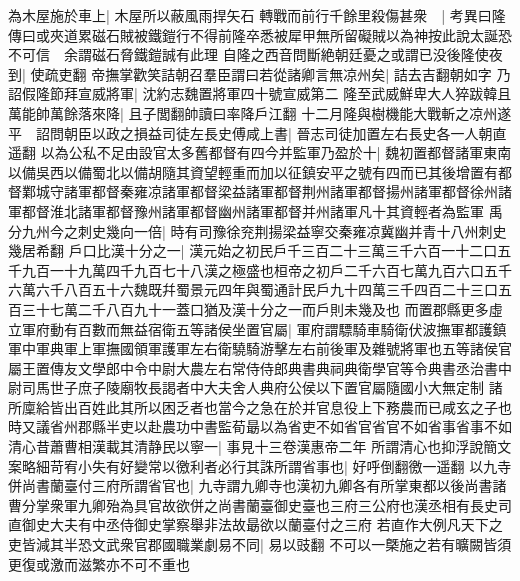 為木屋施於車上|{
	木屋所以蔽風雨捍矢石}
轉戰而前行千餘里殺傷甚衆　|{
	考異曰隆傳曰或夾道累磁石賊被鐵鎧行不得前隆卒悉被犀甲無所留礙賊以為神按此說太誕恐不可信　余謂磁石脅鐵鎧誠有此理}
自隆之西音問斷絶朝廷憂之或謂已没後隆使夜到|{
	使疏吏翻}
帝撫掌歡笑詰朝召羣臣謂曰若從諸卿言無凉州矣|{
	詰去吉翻朝如字}
乃詔假隆節拜宣威將軍|{
	沈約志魏置將軍四十號宣威第二}
隆至武威鮮卑大人猝跋韓且萬能帥萬餘落來降|{
	且子閭翻帥讀曰率降戶江翻}
十二月隆與樹機能大戰斬之凉州遂平　詔問朝臣以政之損益司徒左長史傅咸上書|{
	晉志司徒加置左右長史各一人朝直遥翻}
以為公私不足由設官太多舊都督有四今并監軍乃盈於十|{
	魏初置都督諸軍東南以備吳西以備蜀北以備胡隨其資望輕重而加以征鎮安平之號有四而已其後增置有都督鄴城守諸軍都督秦雍凉諸軍都督梁益諸軍都督荆州諸軍都督揚州諸軍都督徐州諸軍都督淮北諸軍都督豫州諸軍都督幽州諸軍都督并州諸軍凡十其資輕者為監軍}
禹分九州今之刺史幾向一倍|{
	時有司豫徐兖荆揚梁益寧交秦雍凉冀幽并青十八州刺史幾居希翻}
戶口比漢十分之一|{
	漢元始之初民戶千三百二十三萬三千六百一十二口五千九百一十九萬四千九百七十八漢之極盛也桓帝之初戶二千六百七萬九百六口五千六萬六千八百五十六魏既幷蜀景元四年與蜀通計民戶九十四萬三千四百二十三口五百三十七萬二千八百九十一蓋口猶及漢十分之一而戶則未幾及也}
而置郡縣更多虛立軍府動有百數而無益宿衛五等諸侯坐置官屬|{
	軍府謂驃騎車騎衛伏波撫軍都護鎮軍中軍典軍上軍撫國領軍護軍左右衛驍騎游擊左右前後軍及雜號將軍也五等諸侯官屬王置傳友文學郎中令中尉大農左右常侍侍郎典書典祠典衛學官等令典書丞治書中尉司馬世子庶子陵廟牧長謁者中大夫舍人典府公侯以下置官屬隨國小大無定制}
諸所廩給皆出百姓此其所以困乏者也當今之急在於并官息役上下務農而已咸玄之子也時又議省州郡縣半吏以赴農功中書監荀朂以為省吏不如省官省官不如省事省事不如清心昔蕭曹相漢載其清静民以寧一|{
	事見十三卷漢惠帝二年}
所謂清心也抑浮說簡文案略細苛宥小失有好變常以徼利者必行其誅所謂省事也|{
	好呼倒翻徼一遥翻}
以九寺併尚書蘭臺付三府所謂省官也|{
	九寺謂九卿寺也漢初九卿各有所掌東都以後尚書諸曹分掌衆軍九卿殆為具官故欲併之尚書蘭臺御史臺也三府三公府也漢丞相有長史司直御史大夫有中丞侍御史掌察舉非法故朂欲以蘭臺付之三府}
若直作大例凡天下之吏皆減其半恐文武衆官郡國職業劇易不同|{
	易以豉翻}
不可以一槩施之若有曠闕皆須更復或激而滋繁亦不可不重也


